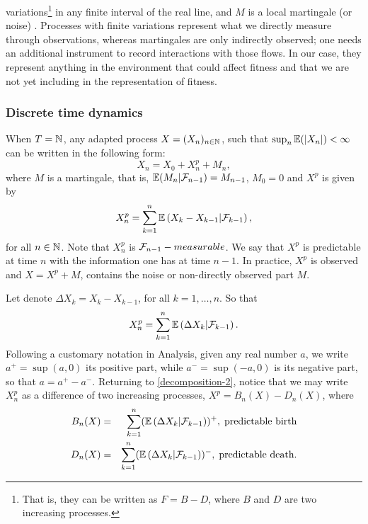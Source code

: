 \documentclass[12pt]{article}
\begin{document}
variations\footnote{That is, they can be written as $F=B-D$, where $B$ and $D$ are two increasing processes.} in any finite interval of the real line, and $M$ is a local martingale (or noise) \citep{Dellacherie-Meyer,Protter}. Processes with finite variations represent what we directly measure through observations, whereas martingales are only indirectly observed; one needs an additional instrument to record interactions with those flows. In our case, they represent anything in the environment that could affect fitness and that we are not yet including in the representation of fitness. 
\subsubsection{Discrete time dynamics}
When $T={\mathbb{N}}^{}$, any adapted process $X=({X}_{n})_{n\in {\mathbb{N}}^{}}$, such that $\sup_n\mathbb{E}(\left\vert X_n\right\vert)<\infty$ can be written in the following form:
\begin{equation}\label{decomposition-1}
    X_n=X_0+X^p_n+M_n,
\end{equation}
where $M$ is a martingale, that is, $\mathbb{E}(M_n|\mathcal{F}_{n-1})=M_{n-1}$, $M_0=0$ and $X^p$ is given by
\begin{equation}\label{decomposition-2}
    X^p_n=\sum_{k=1}^n\mathbb{E}\left(X_k-X_{k-1}|\mathcal{F}_{k-1}\right),
\end{equation}
for all $n\in{\mathbb{N}}^{}$. 
Note that $X^p_n$ is $\mathcal{F}_{n-1}-measurable$. We say that $X^p$ is predictable at time $n$ with the information one has at time $n-1$. In practice, $X^p$ is observed and $X=X^p+M$, contains the noise or non-directly observed part $M$.

Let denote $\Delta X_k=X_k-X_{k-1}$, for all $k=1,\ldots, n$. So that $$X^p_n=\sum_{k=1}^n\mathbb{E}\left(\Delta X_k|\mathcal{F}_{k-1}\right).$$ 
Following a customary notation in Analysis, given any real number $a$, we write $a^+=\sup (a,0)$ its positive part, while $a^-=\sup(-a,0)$ is its negative part, so that $a=a^+-a^-$. Returning to \eqref{decomposition-2}, notice that we may write $X^p_n$ as a difference of two increasing processes, $X^p=B_n(X)-D_n(X)$, where
\begin{eqnarray}
    B_n(X)&=&\sum_{k=1}^n(\mathbb{E}\left (\Delta X_k|\mathcal{F}_{k-1}\right ))^+, \;\text{predictable birth}\\
    D_n(X)&=&\sum_{k=1}^n(\mathbb{E}\left (\Delta X_k|\mathcal{F}_{k-1}\right ))^-,\;\text{predictable death.}
\end{eqnarray}
\end{document}
